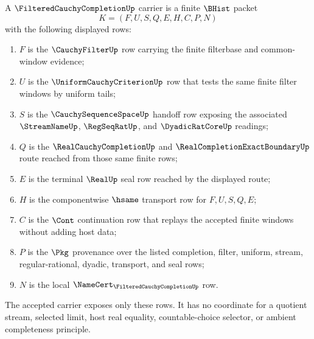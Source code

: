 \begin{definition}\label{def:filtered-cauchy-completion-carrier}
A $\FilteredCauchyCompletionUp$ carrier is a finite $\BHist$ packet
$$
K=(F,U,S,Q,E,H,C,P,N)
$$
with the following displayed rows:
\begin{enumerate}
\item $F$ is the $\CauchyFilterUp$ row carrying the finite filterbase and
common-window evidence;
\item $U$ is the $\UniformCauchyCriterionUp$ row that tests the same finite
filter windows by uniform tails;
\item $S$ is the $\CauchySequenceSpaceUp$ handoff row exposing the associated
$\StreamNameUp$, $\RegSeqRatUp$, and $\DyadicRatCoreUp$ readings;
\item $Q$ is the $\RealCauchyCompletionUp$ and
$\RealCompletionExactBoundaryUp$ route reached from those same finite rows;
\item $E$ is the terminal $\RealUp$ seal row reached by the displayed route;
\item $H$ is the componentwise $\hsame$ transport row for $F,U,S,Q,E$;
\item $C$ is the $\Cont$ continuation row that replays the accepted finite
windows without adding host data;
\item $P$ is the $\Pkg$ provenance over the listed completion, filter,
uniform, stream, regular-rational, dyadic, transport, and seal rows;
\item $N$ is the local $\NameCert_{\FilteredCauchyCompletionUp}$ row.
\end{enumerate}
The accepted carrier exposes only these rows. It has no coordinate for a
quotient stream, selected limit, host real equality, countable-choice
selector, or ambient completeness principle.
\end{definition}

